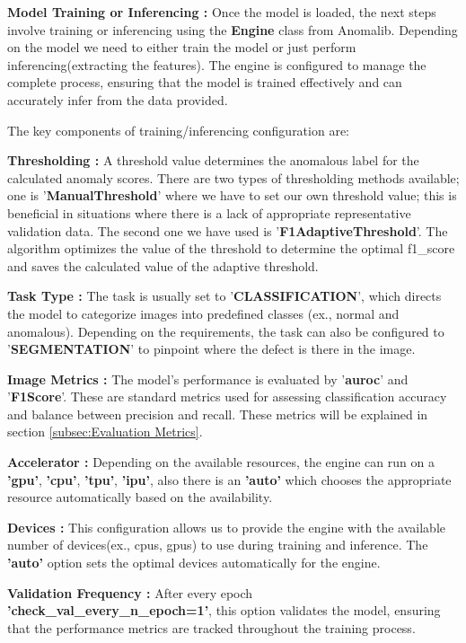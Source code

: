 \textbf{Model Training or Inferencing :} Once the model is loaded, the next steps involve training or inferencing using the \textbf{Engine} class from Anomalib. Depending on the model we need to either train the model or just perform inferencing(extracting the features). The engine is configured to manage the complete process, ensuring that the model is trained effectively and can accurately infer from the data provided.

The key components of training/inferencing configuration are:

\textbf{Thresholding :} A threshold value determines the anomalous label for the calculated anomaly scores. There are two types of thresholding methods available; one is '\textbf{ManualThreshold}' where we have to set our own threshold value; this is beneficial in situations where there is a lack of appropriate representative validation data\cite{9897283}. The second one we have used is '\textbf{F1AdaptiveThreshold}'. The algorithm optimizes the value of the threshold to determine the optimal f1\_score and saves the calculated value of the adaptive threshold.\cite{Anomalib2024}

\textbf{Task Type :} The task is usually set to '\textbf{CLASSIFICATION}', which directs the model to categorize images into predefined classes (ex., normal and anomalous). Depending on the requirements, the task can also be configured to '\textbf{SEGMENTATION}' to pinpoint where the defect is there in the image.

\textbf{Image Metrics :} The model's performance is evaluated by '\textbf{\gls{auroc}}' and '\textbf{F1Score}'. These are standard metrics used for assessing classification accuracy and balance between precision and recall. These metrics will be explained in section \ref{subsec:Evaluation Metrics}.

\textbf{Accelerator :} Depending on the available resources, the engine can run on a \textbf{'\gls{gpu}'}, \textbf{'\gls{cpu}'}, \textbf{'\gls{tpu}'}, \textbf{'\gls{ipu}'}, also there is an \textbf{'auto'} which chooses the appropriate resource automatically based on the availability.

\textbf{Devices :} This configuration allows us to provide the engine with the available number of devices(ex., \glspl{cpu}, \glspl{gpu}) to use during training and inference. The \textbf{'auto'} option sets the optimal devices automatically for the engine.

\textbf{Validation Frequency :} After every epoch \textbf{'check\_val\_every\_n\_epoch=1'}, this option validates the model, ensuring that the performance metrics are tracked throughout the training process.

